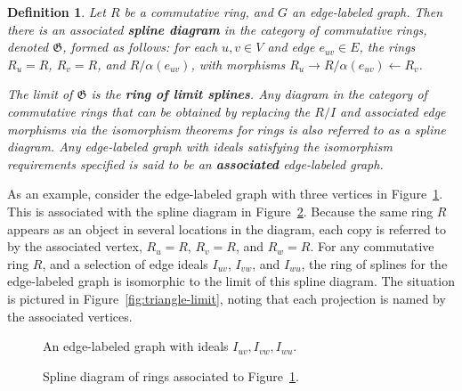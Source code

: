 \documentclass{article}
\newtheorem{definition}{Definition}
\begin{document}
\begin{definition}
Let $R$ be a commutative ring, and $G$ an edge-labeled graph. Then there is an associated \textbf{spline diagram} in the category of commutative rings, denoted $\mathfrak G$, formed as follows: for each $u,v \in V$ and edge $e_{uv} \in E$, the rings $R_u = R$, $R_v = R$, and $R/\alpha(e_{uv})$, with morphisms $R_u \rightarrow R/\alpha(e_{uv}) \leftarrow R_v$.

The limit of $\mathfrak G$ is the \textbf{ring of limit splines}. Any diagram in the category of commutative rings that can be obtained by replacing the $R/I$ and associated edge morphisms via the isomorphism theorems for rings is also referred to as a spline diagram. Any edge-labeled graph with ideals satisfying the isomorphism requirements specified is said to be an \textbf{associated} edge-labeled graph.
\end{definition}

As an example, consider the edge-labeled graph with three vertices in Figure~\ref{fig:edge-triangle}. This is associated with the spline diagram in Figure~\ref{fig:triangle-spline-diagram}. Because the same ring $R$ appears as an object in several locations in the diagram, each copy is referred to by the associated vertex, $R_u=R$, $R_v=R$, and $R_w=R$. For any commutative ring $R$, and a selection of edge ideals $I_{uv}$, $I_{vw}$, and $I_{wu}$, the ring of splines for the edge-labeled graph is isomorphic to the limit of this spline diagram. The situation is pictured in Figure~\ref{fig:triangle-limit}, noting that each projection is named by the associated vertices.

\begin{figure}
\centering
{}
\caption{An edge-labeled graph with ideals $I_{uv}, I_{vw}, I_{wu}$.}
\label{fig:edge-triangle}
\end{figure}



\begin{figure}
\centering
{}
\caption{Spline diagram of rings associated to Figure~\ref{fig:edge-triangle}.}
\label{fig:triangle-spline-diagram}
\end{figure}
\end{document}
